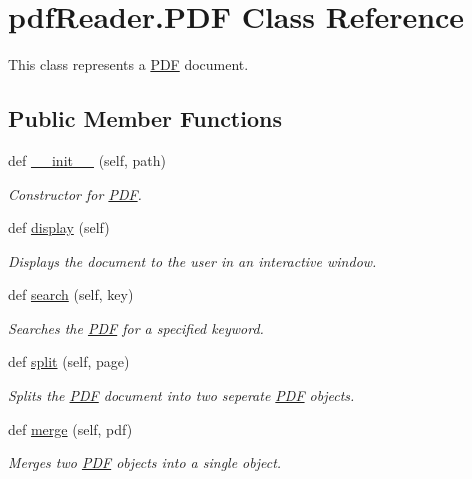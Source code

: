 \hypertarget{classpdfReader_1_1PDF}{}\section{pdf\+Reader.\+P\+DF Class Reference}
\label{classpdfReader_1_1PDF}


This class represents a \hyperlink{classpdfReader_1_1PDF}{P\+DF} document.  


\subsection*{Public Member Functions}
\begin{DoxyCompactItemize}
\item 
def \hyperlink{classpdfReader_1_1PDF_ad3a030d731fe9fdbdd25cbdf2811cfd9}{\+\_\+\+\_\+init\+\_\+\+\_\+} (self, path)
\begin{DoxyCompactList}\small\item\em Constructor for \hyperlink{classpdfReader_1_1PDF}{P\+DF}. \end{DoxyCompactList}\item 
\mbox{\label{classpdfReader_1_1PDF_a4fc2e001f7e9dc04f2a77b2f7988e7d9}} 
def \hyperlink{classpdfReader_1_1PDF_a4fc2e001f7e9dc04f2a77b2f7988e7d9}{display} (self)
\begin{DoxyCompactList}\small\item\em Displays the document to the user in an interactive window. \end{DoxyCompactList}\item 
def \hyperlink{classpdfReader_1_1PDF_adecd6d310fcbaf65067825dcb000c6e5}{search} (self, key)
\begin{DoxyCompactList}\small\item\em Searches the \hyperlink{classpdfReader_1_1PDF}{P\+DF} for a specified keyword. \end{DoxyCompactList}\item 
def \hyperlink{classpdfReader_1_1PDF_ae0c66e62a60c32cf66340a7f63b37706}{split} (self, page)
\begin{DoxyCompactList}\small\item\em Splits the \hyperlink{classpdfReader_1_1PDF}{P\+DF} document into two seperate \hyperlink{classpdfReader_1_1PDF}{P\+DF} objects. \end{DoxyCompactList}\item 
def \hyperlink{classpdfReader_1_1PDF_a64f25f9ee8d33642377bcec567898a23}{merge} (self, pdf)
\begin{DoxyCompactList}\small\item\em Merges two \hyperlink{classpdfReader_1_1PDF}{P\+DF} objects into a single object. \end{DoxyCompactList}\end{DoxyCompactItemize}


